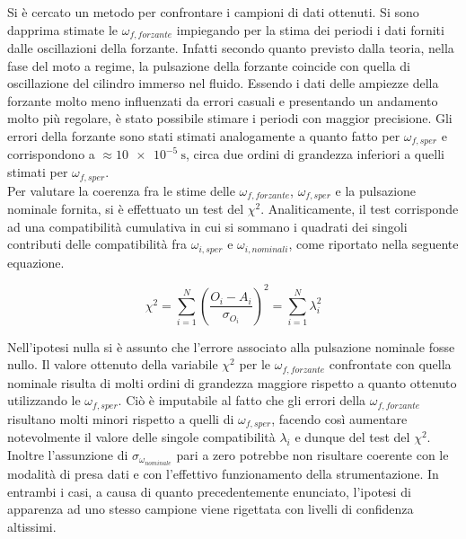 \documentclass[a4paper,11pt,oneside]{article}
\begin{document}
Si è cercato un metodo per confrontare i campioni di dati ottenuti.
Si sono dapprima stimate le $\omega_{f, forzante}$ impiegando per la stima dei periodi i dati forniti dalle oscillazioni della forzante. Infatti secondo quanto previsto dalla teoria, nella fase del moto a regime, la pulsazione della forzante coincide con quella di oscillazione del cilindro immerso nel fluido. Essendo i dati delle ampiezze della forzante molto meno influenzati da errori casuali e presentando un andamento molto più regolare, è stato possibile stimare i periodi con maggior precisione. Gli errori della forzante sono stati stimati analogamente a quanto fatto per $\omega_{f, sper}$ e corrispondono a $\approx \SI{10e-5}{\second}$, circa due ordini di grandezza inferiori a quelli stimati per $\omega_{f, sper}$.\\

Per valutare la coerenza fra le stime delle $\omega_{f,forzante}$, $\omega_{f, sper}$ e la pulsazione nominale fornita, si è effettuato un test del $\chi^2$. Analiticamente, il test corrisponde ad una compatibilità cumulativa in cui si sommano i quadrati dei singoli contributi delle compatibilità fra $\omega_{i, sper}$ e $\omega_{i, nominali}$, come riportato nella seguente equazione.

\begin{equation*}
    \chi^{2}= \sum\limits_{i=1}^{N} \left(\frac{O_i - A_i}{\sigma_{O_i}} \right) ^2 = \sum\limits_{i=1}^{N} \lambda_{i}^2
\end{equation*}

Nell'ipotesi nulla si è assunto che l'errore associato alla pulsazione nominale fosse nullo. Il valore ottenuto della variabile $\chi^{2}$ per le $\omega_{f, forzante}$ confrontate con quella nominale risulta di molti ordini di grandezza maggiore rispetto a quanto ottenuto utilizzando le $\omega_{f, sper}$. 
Ciò è imputabile al fatto che gli errori della $\omega_{f, forzante}$ risultano molti minori rispetto a quelli di $\omega_{f, sper}$, facendo così aumentare notevolmente il valore delle singole compatibilità $\lambda_{i}$ e dunque del test del $\chi^2$. Inoltre l'assunzione di $\sigma_{\omega_{nominale}}$ pari a zero potrebbe non risultare coerente con le modalità di presa dati e con l'effettivo funzionamento della strumentazione.
In entrambi i casi, a causa di quanto precedentemente enunciato, l'ipotesi di apparenza ad uno stesso campione viene rigettata con livelli di confidenza altissimi.
\end{document}
